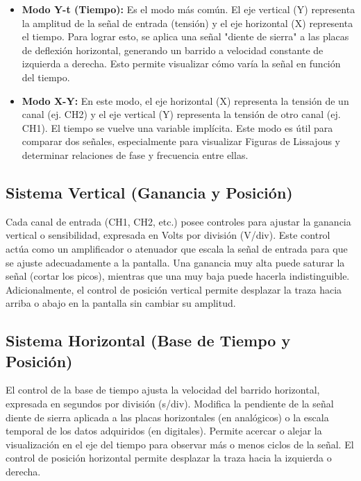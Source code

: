 \begin{itemize}
    \item \textbf{Modo Y-t (Tiempo):} Es el modo más común. El eje vertical (Y) representa la amplitud de la señal de entrada (tensión) y el eje horizontal (X) representa el tiempo. Para lograr esto, se aplica una señal "diente de sierra" a las placas de deflexión horizontal, generando un barrido a velocidad constante de izquierda a derecha. Esto permite visualizar cómo varía la señal en función del tiempo.
    \item \textbf{Modo X-Y:} En este modo, el eje horizontal (X) representa la tensión de un canal (ej. CH2) y el eje vertical (Y) representa la tensión de otro canal (ej. CH1). El tiempo se vuelve una variable implícita. Este modo es útil para comparar dos señales, especialmente para visualizar Figuras de Lissajous y determinar relaciones de fase y frecuencia entre ellas.
\end{itemize}

\subsection{Sistema Vertical (Ganancia y Posición)}
Cada canal de entrada (CH1, CH2, etc.) posee controles para ajustar la ganancia vertical o sensibilidad, expresada en Volts por división (V/div). Este control actúa como un amplificador o atenuador que escala la señal de entrada para que se ajuste adecuadamente a la pantalla. Una ganancia muy alta puede saturar la señal (cortar los picos), mientras que una muy baja puede hacerla indistinguible. Adicionalmente, el control de posición vertical permite desplazar la traza hacia arriba o abajo en la pantalla sin cambiar su amplitud.

\subsection{Sistema Horizontal (Base de Tiempo y Posición)}
El control de la base de tiempo ajusta la velocidad del barrido horizontal, expresada en segundos por división (s/div). Modifica la pendiente de la señal diente de sierra aplicada a las placas horizontales (en analógicos) o la escala temporal de los datos adquiridos (en digitales). Permite acercar o alejar la visualización en el eje del tiempo para observar más o menos ciclos de la señal. El control de posición horizontal permite desplazar la traza hacia la izquierda o derecha.


